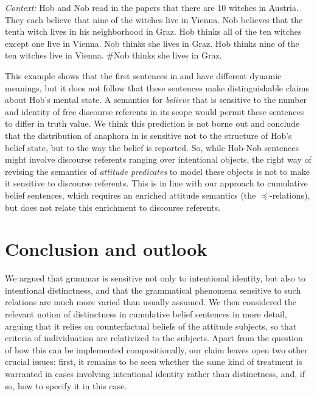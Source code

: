 \documentclass[output=paper]{langscibook}
\begin{document}
\eanoraggedright \label{sch-has:ex:52}
\eanoraggedright \label{sch-has:ex:52a} \textit{Context:} Hob and Nob read in the papers that there are 10 witches in Austria. They each  believe that nine of the witches live in Vienna. Nob believes that the tenth witch lives in his neighborhood in Graz.
\ex \label{sch-has:ex:52b} Hob thinks all of the ten witches except one live in Vienna. Nob thinks she lives in Graz.
\ex \label{sch-has:ex:52c} Hob thinks nine of the ten witches live in Vienna. \#Nob thinks she lives in Graz. \z
\z

\noindent This example shows that the first sentences in  and  have different dynamic meanings, but it does not follow that these sentences make distinguishable claims about Hob's mental state. A semantics for \textit{believe} that is sensitive to the number and identity of free discourse referents in its scope would permit these sentences to differ in truth value. We think this prediction is not borne out %
and conclude that the distribution of anaphora in  is sensitive not to the structure of Hob's belief state, but to the way the belief is reported. So, while Hob-Nob sentences might involve discourse referents ranging over intentional objects, the right way of revising the semantics of \textit{attitude predicates} to model these objects is not to make it sensitive to discourse referents. This is in line with our approach to cumulative belief sentences, which requires an enriched attitude semantics (the $\preceq$-relations), but does not relate this enrichment to discourse referents. 

\section{Conclusion and outlook}

We argued that grammar is sensitive not only to intentional identity, but also to intentional distinctness, and that the grammatical phenomena sensitive to such relations are much more varied than usually assumed. We then considered the relevant notion of distinctness in cumulative belief sentences in more detail, arguing that it relies on counterfactual beliefs of the attitude subjects, so that criteria of individuation are relativized to the subjects. Apart from the question of how this can be implemented compositionally, our claim leaves open two other crucial issues: first, it remains to be seen whether the same  kind of treatment is warranted in cases involving intentional identity rather than distinctness, and, if so, how to specify it in this case. 
\end{document}
